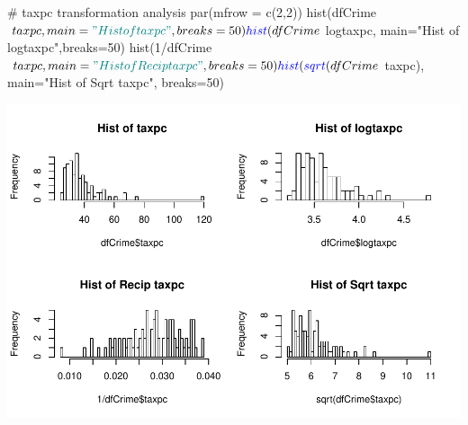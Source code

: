 \documentclass[]{article}
\newenvironment{Shaded}{}{}
\newcommand{\CommentTok}[1]{\textcolor[rgb]{0.00,0.50,0.00}{#1}}
\newcommand{\DataTypeTok}[1]{#1}
\newcommand{\DecValTok}[1]{#1}
\newcommand{\KeywordTok}[1]{\textcolor[rgb]{0.00,0.00,1.00}{#1}}
\newcommand{\NormalTok}[1]{#1}
\newcommand{\OperatorTok}[1]{#1}
\newcommand{\StringTok}[1]{\textcolor[rgb]{0.00,0.50,0.50}{#1}}
\begin{document}
\begin{Shaded}
\begin{Highlighting}[]
\CommentTok{# taxpc transformation analysis }
\KeywordTok{par}\NormalTok{(}\DataTypeTok{mfrow =} \KeywordTok{c}\NormalTok{(}\DecValTok{2}\NormalTok{,}\DecValTok{2}\NormalTok{))}
\KeywordTok{hist}\NormalTok{(dfCrime}\OperatorTok{$}\NormalTok{taxpc, }\DataTypeTok{main=}\StringTok{"Hist of taxpc"}\NormalTok{, }\DataTypeTok{breaks=}\DecValTok{50}\NormalTok{)}
\KeywordTok{hist}\NormalTok{(dfCrime}\OperatorTok{$}\NormalTok{logtaxpc, }\DataTypeTok{main=}\StringTok{"Hist of logtaxpc"}\NormalTok{,}\DataTypeTok{breaks=}\DecValTok{50}\NormalTok{)}
\KeywordTok{hist}\NormalTok{(}\DecValTok{1}\OperatorTok{/}\NormalTok{dfCrime}\OperatorTok{$}\NormalTok{taxpc, }\DataTypeTok{main=}\StringTok{"Hist of Recip taxpc"}\NormalTok{, }\DataTypeTok{breaks=}\DecValTok{50}\NormalTok{)}
\KeywordTok{hist}\NormalTok{(}\KeywordTok{sqrt}\NormalTok{(dfCrime}\OperatorTok{$}\NormalTok{taxpc), }\DataTypeTok{main=}\StringTok{"Hist of Sqrt taxpc"}\NormalTok{, }\DataTypeTok{breaks=}\DecValTok{50}\NormalTok{)}
\end{Highlighting}
\end{Shaded}

\includegraphics{Bagnard_Gaustad_Hartman_Leung_Lab_3_files/figure-latex/unnamed-chunk-83-1.pdf}
\end{document}
